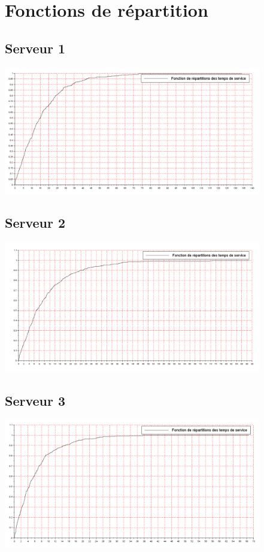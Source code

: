 \documentclass{article}
\begin{document}
\section{Fonctions de répartition}

\subsection{Serveur 1}
\begin{center}
\includegraphics[width=425px]{img/S1_repart.png}
\end{center}
\paragraph{}

\subsection{Serveur 2}
\begin{center}
\includegraphics[width=425px]{img/S2_repart.png}
\end{center}
\paragraph{}

\subsection{Serveur 3}
\begin{center}
\includegraphics[width=425px]{img/S3_repart.png}
\end{center}
\end{document}
